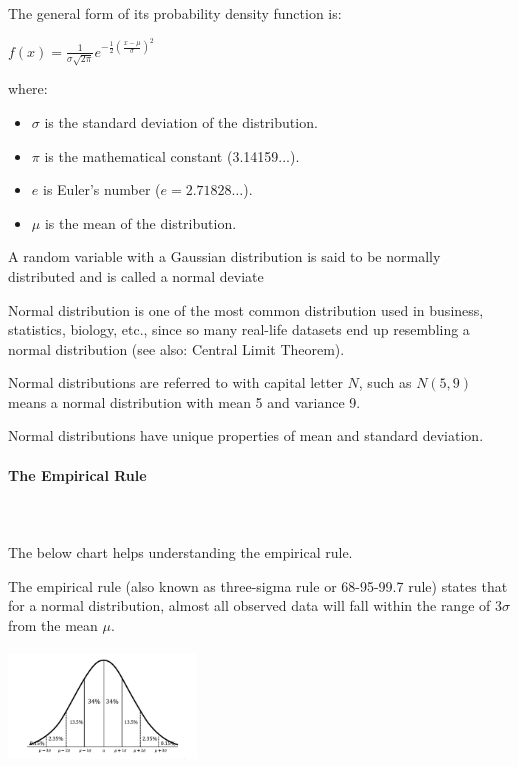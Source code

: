 \documentclass{article}
\begin{document}
The general form of its probability density function is:

$\displaystyle f(x)={\frac {1}{\sigma {\sqrt {2\pi }}}}e^{-{\frac {1}{2}}\left({\frac {x-\mu }{\sigma }}\right)^{2}}$

where:
\begin{itemize}
    \item $\sigma$ is the standard deviation of the distribution.
    \item $\pi$ is the mathematical constant (3.14159...).
    \item $e$ is Euler's number ($ e=2.71828\ldots$).
    \item $\mu$ is the mean of the distribution.
\end{itemize}

A random variable with a Gaussian distribution is said to be normally distributed and is called a normal deviate

Normal distribution is one of the most common distribution used in business, statistics, biology, etc., since so many real-life datasets end up resembling a normal distribution (see also: Central Limit Theorem).

Normal distributions are referred to with capital letter $N$, such as $N(5,9)$ means a normal distribution with mean 5 and variance 9.

Normal distributions have unique properties of mean and standard deviation.

\paragraph{The Empirical Rule}\mbox{} \\
\mbox{} \\

The below chart helps understanding the empirical rule.

The empirical rule (also known as three-sigma rule or 68-95-99.7 rule) states that for a normal distribution, almost all observed data will fall within the range of $3 \sigma $ from the mean $ \mu $. 

\includegraphics[width=5cm, height=3cm]{empirical}
\end{document}
